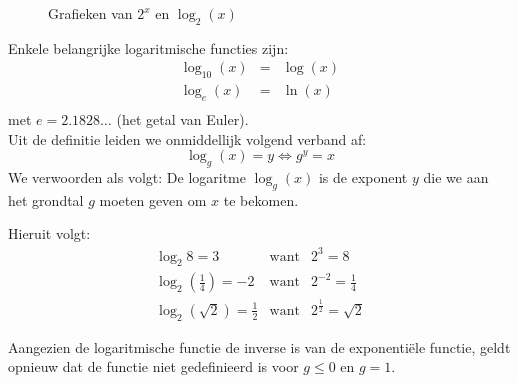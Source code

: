 \begin{figure}[htbp]
    \centering
    \caption{Grafieken van $2^{x}$ en $\log_{2}(x)$}
    \label{fig:log2}
\end{figure}

Enkele belangrijke logaritmische functies zijn:
\begin{eqnarray*}
    \log_{10}(x) & = & \log(x)  \\
    \log_{e}(x) & = & \ln(x) \\
     \end{eqnarray*}
met  $e=\num{2.1828}\ldots$ (het getal van Euler). \\

Uit de definitie leiden we onmiddellijk volgend verband af:
\begin{displaymath}
    \log_{g}(x)=y   \Leftrightarrow  g^{y}=x
\end{displaymath}
We verwoorden als volgt: De logaritme $\log_{g}(x)$ is de
exponent $y$ die we aan het grondtal $g$ moeten geven om $ x$ te
bekomen.






Hieruit volgt:
\begin{eqnarray*}
    \log_{2}8=3 & \mbox{want} & 2^{3}=8  \\
    \log_{2}\left(\frac{1}{4}\right)=-2 & \mbox{want} & 2^{-2}=\frac{1}{4}  \\
    \log_{2}(\sqrt{2})=\frac{1}{2} & \mbox{want} &  2^{\frac{1}{2}}=\sqrt{2}
\end{eqnarray*}

Aangezien de logaritmische functie de inverse is van de
exponenti\"{e}le functie, geldt opnieuw dat de functie niet
gedefinieerd is voor $g\leq 0$ en $g=1$.  


